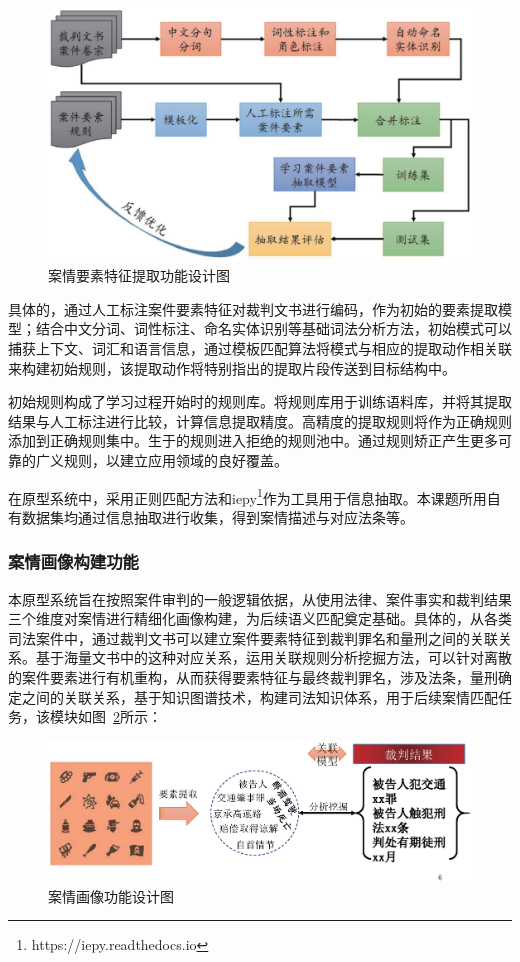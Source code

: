 \begin{figure}[htbp]%
    \centering
    \includegraphics[scale=0.5, clip=true]{./sources/sys_element_tech.eps}
    \caption{\label{fig:sys_element_tech}案情要素特征提取功能设计图}
\end{figure}

具体的，通过人工标注案件要素特征对裁判文书进行编码，作为初始的要素提取模型；结合中文分词、词性标注、命名实体识别等基础词法分析方法，初始模式可以捕获上下文、词汇和语言信息，通过模板匹配算法将模式与相应的提取动作相关联来构建初始规则，该提取动作将特别指出的提取片段传送到目标结构中。

初始规则构成了学习过程开始时的规则库。将规则库用于训练语料库，并将其提取结果与人工标注进行比较，计算信息提取精度。高精度的提取规则将作为正确规则添加到正确规则集中。生于的规则进入拒绝的规则池中。通过规则矫正产生更多可靠的广义规则，以建立应用领域的良好覆盖。

在原型系统中，采用正则匹配方法和iepy\footnote{https://iepy.readthedocs.io}作为工具用于信息抽取。本课题所用自有数据集均通过信息抽取进行收集，得到案情描述与对应法条等。

\subsubsection{案情画像构建功能}
本原型系统旨在按照案件审判的一般逻辑依据，从使用法律、案件事实和裁判结果三个维度对案情进行精细化画像构建，为后续语义匹配奠定基础。具体的，从各类司法案件中，通过裁判文书可以建立案件要素特征到裁判罪名和量刑之间的关联关系。基于海量文书中的这种对应关系，运用关联规则分析挖掘方法，可以针对离散的案件要素进行有机重构，从而获得要素特征与最终裁判罪名，涉及法条，量刑确定之间的关联关系，基于知识图谱技术，构建司法知识体系，用于后续案情匹配任务，该模块如图~\ref{fig:sys_picture}所示：
\begin{figure}[htbp]%
    \centering
    \includegraphics[scale=0.5, clip=true]{./sources/sys_picture.eps}
    \caption{\label{fig:sys_picture}案情画像功能设计图}
\end{figure}


